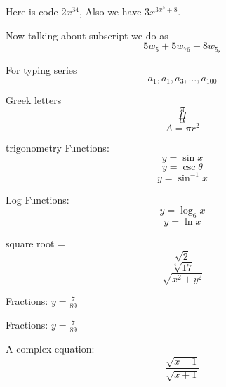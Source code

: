 \documentclass[11pt]{article}
\begin{document}
	
	Here is code $2x^{34}$, Also we have $3x^{3x^5+8}$.
	
	Now talking about subscript we do as $$5w_5 + 5w_{76} + 8w_{5_8}$$
	
	For typing series $$a_1, a_1, a_3, \ldots, a_{100} $$
	
	Greek letters $$\pi$$ 
	$$\Pi$$  $$\alpha$$ $$A = \pi r^2$$
	
	trigonometry Functions:
	$$y = \sin x$$ $$y = \csc \theta$$
	$$y = \sin^{-1} x$$
	
	Log Functions: $$y = \log_6 x$$
	$$y = \ln x$$
	
	square root = $$\sqrt{2}$$
	$$\sqrt[4]{17}$$  $$\sqrt {x^2 + y^2}$$
	
	Fractions: $y = \frac{7}{89}$ 
	
	Fractions: $y = \displaystyle \frac{7}{89}$
	
	A complex equation: $$\frac{\sqrt{x-1}}{\sqrt{x+1}}$$
	
	
	
	
	 
	
\end{document}
